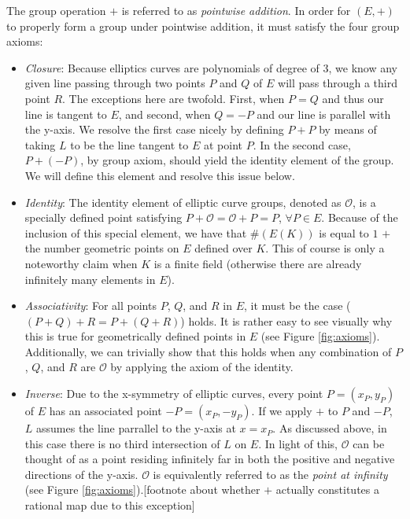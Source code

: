 The group operation $+$ is referred to as \emph{pointwise addition}. In order for $(E,+)$ to properly form a group under pointwise addition, it must satisfy the four group axioms:
\begin{itemize}
\item \emph{Closure}: Because elliptics curves are polynomials of degree of 3, we know any given line passing through two points $P$ and $Q$ of $E$ will pass through a third point $R$. The exceptions here are twofold. First, when $P = Q$ and thus our line is tangent to $E$, and second, when $Q = -P$ and our line is parallel with the y-axis. We resolve the first case nicely by defining $P + P$ by means of taking $L$ to be the line tangent to $E$ at point $P$. In the second case, $P + (-P)$, by group axiom, should yield the identity element of the group. We will define this element and resolve this issue below.  
\item \emph{Identity}: The identity element of elliptic curve groups, denoted as $\mathcal{O}$, is a specially defined point satisfying $P + \mathcal{O} = \mathcal{O} + P = P$, $\forall P \in E$. Because of the inclusion of this special element, we have that $\#(E(K))$ is equal to $1$ $+$ the number geometric points on $E$ defined over $K$. This of course is only a noteworthy claim when $K$ is a finite field (otherwise there are already infinitely many elements in $E$).
\item \emph{Associativity}: For all points $P$, $Q$, and $R$ in $E$, it must be the case ($(P + Q) + R = P + (Q + R)$) holds. It is rather easy to see visually why this is true for geometrically defined points in $E$ (see Figure \ref{fig:axioms}). Additionally, we can trivially show that this holds when any combination of $P$, $Q$, and $R$ are $\mathcal{O}$ by applying the axiom of the identity.
\item \emph{Inverse}: Due to the x-symmetry of elliptic curves, every point $P = (x_P, y_P)$ of $E$ has an associated point $-P = (x_P, -y_P)$. If we apply $+$ to $P$ and $-P$, $L$ assumes the line parrallel to the y-axis at $x = x_P$. As discussed above, in this case there is no third intersection of $L$ on $E$. In light of this, $\mathcal{O}$ can be thought of as a point residing infinitely far in both the positive and negative directions of the y-axis. $\mathcal{O}$ is equivalently referred to as the \emph{point at infinity} (see Figure \ref{fig:axioms}).[footnote about whether $+$ actually constitutes a rational map due to this exception] 
\end{itemize}


